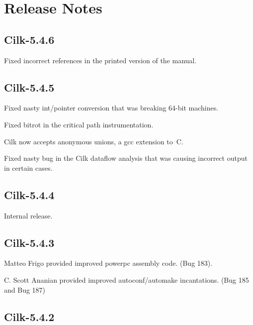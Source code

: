 
\chapter*{\vspace*{-1cm}
Release Notes}

\vspace*{-.3cm}

\section*{Cilk-5.4.6}
\begin{closeitemize}
\item Fixed incorrect references in the printed version of the manual.
\end{closeitemize}

\section*{Cilk-5.4.5}
\begin{closeitemize}
\item Fixed nasty int/pointer conversion that was breaking 64-bit
  machines.
\item Fixed bitrot in the critical path instrumentation.
\item Cilk now accepts anonymous unions, a gcc extension to~C.
\item Fixed nasty bug in the Cilk dataflow analysis that was causing
  incorrect output in certain cases.
\end{closeitemize}

\section*{Cilk-5.4.4}
Internal release.

\section*{Cilk-5.4.3}
\begin{closeitemize}
\item Matteo Frigo provided improved powerpc assembly code. (Bug 183).
\item C. Scott Ananian provided improved autoconf/automake incantations.  (Bug 185 and Bug 187)
\end{closeitemize}

\section*{Cilk-5.4.2}

